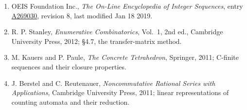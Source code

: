 \documentclass[11pt]{article}
\theoremstyle{definition}
\begin{document}
\begin{enumerate}

\item OEIS Foundation Inc., \emph{The On-Line Encyclopedia of Integer Sequences}, entry \href{https://oeis.org/A269030}{A269030}, revision 8, last modified Jan 18 2019.

\item R. P. Stanley, \emph{Enumerative Combinatorics}, Vol.~1, 2nd ed., Cambridge University Press, 2012; \S4.7, the transfer-matrix method.

\item M. Kauers and P. Paule, \emph{The Concrete Tetrahedron}, Springer, 2011; C-finite sequences and their closure properties.

\item J. Berstel and C. Reutenauer, \emph{Noncommutative Rational Series with Applications}, Cambridge University Press, 2011; linear representations of counting automata and their reduction.

\end{enumerate}
\end{document}

